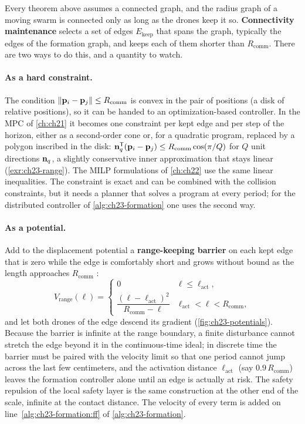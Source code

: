 Every theorem above assumes a connected graph, and the radius graph of a
moving swarm is connected only as long as the drones keep it so.
\textbf{Connectivity maintenance} selects a
set of edges $E_{\mathrm{keep}}$ that spans the graph, typically the edges of
the formation graph, and keeps each of them shorter than $R_{\mathrm{comm}}$.
There are two ways to do this, and a quantity to watch.

\paragraph{As a hard constraint.}
The condition $\left\lVert \mathbf{p}_i - \mathbf{p}_j \right\rVert \le R_{\mathrm{comm}}$ is convex in the
pair of positions (a disk of relative positions), so it can be handed to an
optimization-based controller. In the MPC of \cref{ch:ch21} it becomes one
constraint per kept edge and per step of the horizon, either as a second-order
cone or, for a quadratic program, replaced by a polygon inscribed in the disk:
$\mathbf{n}_q^{\mathsf{T}}(\mathbf{p}_i - \mathbf{p}_j) \le R_{\mathrm{comm}}\cos(\pi/Q)$ for $Q$ unit
directions $\mathbf{n}_q$, a slightly conservative inner approximation that
stays linear (\cref{exr:ch23-range}). The MILP formulations of \cref{ch:ch22}
use the same linear inequalities. The constraint is exact and can be combined
with the collision constraints, but it needs a planner that solves a program
at every period; for the distributed controller of \cref{alg:ch23-formation}
one uses the second way.

\paragraph{As a potential.}
Add to the displacement potential a \textbf{range-keeping barrier}
on each kept edge that is zero while the edge is comfortably short and grows
without bound as the length approaches $R_{\mathrm{comm}}$
\cite{ji2007distributed,zavlanos2011graph}:
\begin{equation}
  V_{\mathrm{range}}(\ell) = \begin{cases}
    0 & \ell \le \ell_{\mathrm{act}},\\[2pt]
    \dfrac{(\ell - \ell_{\mathrm{act}})^2}{R_{\mathrm{comm}} - \ell} & \ell_{\mathrm{act}} < \ell < R_{\mathrm{comm}},
  \end{cases}
  \label{eq:ch23-barrier}
\end{equation}
and let both drones of the edge descend its gradient (\cref{fig:ch23-potentials}).
Because the barrier is infinite at the range boundary, a finite disturbance
cannot stretch the edge beyond it in the continuous-time ideal; in discrete
time the barrier must be paired with the velocity limit so that one period
cannot jump across the last few centimeters, and the activation distance
$\ell_{\mathrm{act}}$ (say $0.9\,R_{\mathrm{comm}}$) leaves the formation
controller alone until an edge is actually at risk. The safety repulsion of
the local safety layer is the same construction at the other end of the scale,
infinite at the contact distance. The velocity of every term is added on
line~\ref{alg:ch23-formation:ff} of \cref{alg:ch23-formation}.

